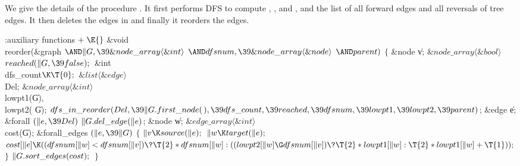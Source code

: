We give the details of the procedure . It first performs
DFS
to compute , ,  and , and the list 
of all forward edges and all reversals of tree edges.
It then deletes the edges in  and finally it
reorders the edges.

\Y\B\4:auxiliary functions\X${}\mathrel+\E{}$\6
\&{void} \\{reorder}(\&{graph} ${}{\AND}\|G,\39\&{node\_array}\langle\&{int}%
\rangle{}$ ${}{\AND}\\{dfsnum},\39\&{node\_array}\langle\&{node}\rangle{}$ ${}{%
\AND}\\{parent}){}$\1\1\2\2\6
${}\{{}$\1\6
\&{node} \|v;\6
${}\&{node\_array}\langle\&{bool}\rangle{}$ ${}\\{reached}(\|G,\39%
\\{false});{}$\6
\&{int} \\{dfs\_count}${}\K\T{0};{}$\6
${}\&{list}\langle\&{edge}\rangle{}$ \\{Del};\6
${}\&{node\_array}\langle\&{int}\rangle{}$ \\{lowpt1}(\|G)${},{}$ \\{lowpt2}(%
\|G);\7
${}\\{dfs\_in\_reorder}(\\{Del},\39\|G.\\{first\_node}(\,),\39\\{dfs\_count},%
\39\\{reached},\39\\{dfsnum},\39\\{lowpt1},\39\\{lowpt2},\39\\{parent}){}$;\7
\&{edge} \|e;\7
\&{forall} ${}(\|e,\39\\{Del}){}$\1\5
${}\|G.\\{del\_edge}(\|e){}$;\2\7
\&{node} \|w;\6
${}\&{edge\_array}\langle\&{int}\rangle{}$ \\{cost}(\|G);\7
\&{forall\_edges} ${}(\|e,\39\|G){}$\5
${}\{{}$\1\6
${}\|v\K\\{source}(\|e);{}$\6
${}\|w\K\\{target}(\|e);{}$\6
${}\\{cost}[\|e]\K((\\{dfsnum}[\|w]<\\{dfsnum}[\|v])\?\T{2}*\\{dfsnum}[\|w]:((%
\\{lowpt2}[\|w]\G\\{dfsnum}[\|v])\?\T{2}*\\{lowpt1}[\|w]:\T{2}*\\{lowpt1}[\|w]+%
\T{1}));{}$\6
\4${}\}{}$\2\6
${}\|G.\\{sort\_edges}(\\{cost});{}$\6
\4${}\}{}$\2\par
\fi


